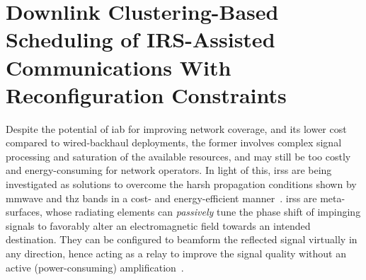 \chapter{Downlink Clustering-Based Scheduling of IRS-Assisted Communications With Reconfiguration Constraints}
\label{sec:introduction}



Despite the potential of \gls{iab} for improving network coverage, and its lower cost compared to wired-backhaul deployments, the former involves complex signal processing and saturation of the available resources, and may still be too costly and energy-consuming for network operators.
In light of this, \glspl{irs} are being investigated as solutions to overcome the harsh propagation conditions shown by \gls{mmwave} and \gls{thz} bands in a cost- and energy-efficient manner~\cite{flamini2022towards}. 
\glspl{irs} are meta-surfaces, whose radiating elements can \emph{passively} tune the phase shift of impinging signals to favorably alter an electromagnetic field towards an intended destination. They can be configured to beamform the reflected signal virtually in any direction, hence acting as a relay to improve the signal quality without an active (power-consuming) amplification~\cite{bjornson2019intelligent}. 

